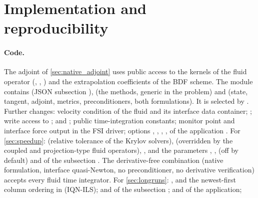 \documentclass[11pt,a4paper]{article}
\theoremstyle{definition}
\theoremstyle{remark}
\begin{document}
\section{Implementation and reproducibility}
\sloppy

\paragraph{Code.} The adjoint of \cref{sec:native_adjoint} uses public access to the kernels of the
fluid operator (, ,
) and the extrapolation coefficients of the BDF scheme. The module 
contains  (JSON subsection ),  (the
methods, generic in the problem) and  (state, tangent, adjoint, metrics,
preconditioners, both formulations). It is selected by . Further changes:  velocity condition of the fluid and its
interface data container; ; write access to
;  and
; public time-integration constants; monitor point and interface force
output in the FSI driver; options , ,
, ,  of the application .
For \cref{sec:speedup}:  (relative tolerance of the
Krylov solvers),  (overridden by the coupled
and projection-type fluid operators), ,
and the parameters , , 
(off by default) and  of the subsection . The
derivative-free combination (native formulation, interface quasi-Newton, no preconditioner, no
derivative verification) accepts every fluid time integrator.
For \cref{sec:longruns}: , 
and the newest-first column ordering in  (IQN-ILS);
 and  of the subsection
;  and  of the application;
\end{document}
